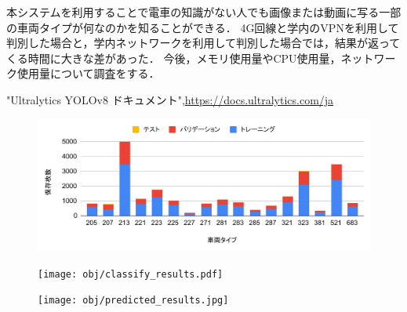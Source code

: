 \begin{multicols*}{2}
本システムを利用することで電車の知識がない人でも画像または動画に写る一部の車両タイプが何なのかを知ることができる．
4G回線と学内のVPNを利用して判別した場合と，学内ネットワークを利用して判別した場合では，結果が返ってくる時間に大きな差があった．
今後，メモリ使用量やCPU使用量，ネットワーク使用量について調査をする．

\begin{thebibliography}{99}
	"Ultralytics YOLOv8 ドキュメント",\url{https://docs.ultralytics.com/ja}
\end{thebibliography}


\begin{figure}
	\centering
	\includegraphics[width=\linewidth]{obj/chart2.pdf}
\end{figure}


\begin{figure}
	\centering
	\texttt{[image: obj/classify\_results.pdf]}
\end{figure}


\begin{figure}
	\centering
	\texttt{[image: obj/predicted\_results.jpg]}
\end{figure}



\end{multicols*}
